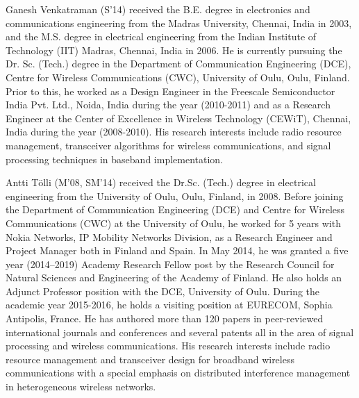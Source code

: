 \begin{IEEEbiography}{Ganesh Venkatraman}
	(S'14) received the B.E. degree in electronics and communications engineering from the Madras University, Chennai, India in 2003, and the M.S. degree in electrical engineering from the Indian Institute of Technology (IIT) Madras, Chennai, India in 2006. He is currently pursuing the Dr. Sc. (Tech.) degree in the Department of Communication Engineering (DCE), Centre for Wireless Communications (CWC), University of Oulu, Oulu, Finland. Prior to this, he worked as a Design Engineer in the Freescale Semiconductor India Pvt. Ltd., Noida, India during the year (2010-2011) and as a Research Engineer at the Center of Excellence in Wireless Technology (CEWiT), Chennai, India during the year (2008-2010). His research interests include radio resource management, transceiver algorithms for wireless communications, and signal processing techniques in baseband implementation.
\end{IEEEbiography}


\begin{IEEEbiography}{Antti T\"olli}
(M'08, SM'14) received the Dr.Sc. (Tech.) degree in electrical engineering from the University of Oulu, Oulu, Finland, in 2008. Before joining the Department of Communication Engineering (DCE) and Centre for Wireless Communications (CWC) at the University of Oulu, he worked for 5 years with Nokia Networks, IP Mobility Networks Division, as a Research Engineer and Project Manager both in Finland and Spain. In May 2014, he was granted a five year (2014--2019) Academy Research Fellow post by the Research Council for Natural Sciences and Engineering of the Academy of Finland. He also holds an Adjunct Professor position with the DCE, University of Oulu. During the academic year 2015-2016, he holds a visiting position at EURECOM, Sophia Antipolis, France. He has authored more than 120 papers in peer-reviewed international journals and conferences and several patents all in the area
of signal processing and wireless communications. His research interests include radio resource management and transceiver design for broadband wireless communications with a special emphasis on distributed interference management in heterogeneous wireless networks. 
\end{IEEEbiography}

